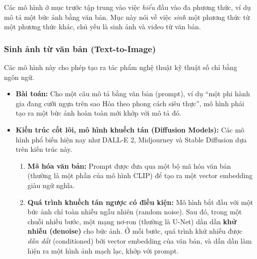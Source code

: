 Các mô hình ở mục trước tập trung vào việc \textit{hiểu} đầu vào đa phương thức, ví dụ mô tả một bức ảnh bằng văn bản. Mục này nói về việc \textit{sinh} một phương thức từ một phương thức khác, chủ yếu là sinh ảnh và video từ văn bản.

\subsubsection{Sinh ảnh từ văn bản (Text-to-Image)}
Các mô hình này cho phép tạo ra tác phẩm nghệ thuật kỹ thuật số chỉ bằng ngôn ngữ.
\begin{itemize}
    \item \textbf{Bài toán:} Cho một câu mô tả bằng văn bản (prompt), ví dụ “một phi hành gia đang cưỡi ngựa trên sao Hỏa theo phong cách siêu thực”, mô hình phải tạo ra một bức ảnh hoàn toàn mới khớp với mô tả đó.
    \item \textbf{Kiến trúc cốt lõi, mô hình khuếch tán (Diffusion Models):} Các mô hình phổ biến hiện nay như DALL-E 2, Midjourney và Stable Diffusion dựa trên kiến trúc này.
        \begin{enumerate}
            \item \textbf{Mã hóa văn bản:} Prompt được đưa qua một bộ mã hóa văn bản (thường là một phần của mô hình CLIP) để tạo ra một vector embedding giàu ngữ nghĩa.
            \item \textbf{Quá trình khuếch tán ngược có điều kiện:} Mô hình bắt đầu với một bức ảnh chỉ toàn nhiễu ngẫu nhiên (random noise). Sau đó, trong một chuỗi nhiều bước, một mạng nơ-ron (thường là U-Net) dần dần \textbf{khử nhiễu (denoise)} cho bức ảnh. Ở mỗi bước, quá trình khử nhiễu được \textit{dẫn dắt} (conditioned) bởi vector embedding của văn bản, và dần dần làm hiện ra một hình ảnh mạch lạc, khớp với prompt.
        \end{enumerate}
\end{itemize}
\begin{center}
    \label{fig:text_to_image_diffusion}
\end{center}

